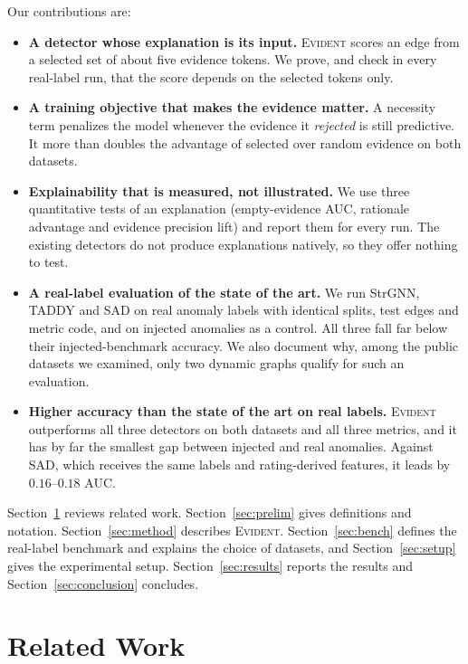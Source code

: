 \documentclass[pdflatex,sn-basic]{sn-jnl}
\newcommand{\evident}{\textsc{Evident}}
\theoremstyle{definition}
\theoremstyle{plain}
\begin{document}
Our contributions are:
\begin{itemize}
\item \textbf{A detector whose explanation is its input.} \evident{} scores an
edge from a selected set of about five evidence tokens. We prove, and check
in every real-label run, that the score depends on the selected tokens only.
\item \textbf{A training objective that makes the evidence matter.} A necessity
term penalizes the model whenever the evidence it \emph{rejected} is still
predictive. It more than doubles the advantage of selected over random
evidence on both datasets.
\item \textbf{Explainability that is measured, not illustrated.} We use three
quantitative tests of an explanation (empty-evidence AUC, rationale advantage
and evidence precision lift) and report them for every run. The existing
detectors do not produce explanations natively, so they offer nothing to test.
\item \textbf{A real-label evaluation of the state of the art.} We run StrGNN,
TADDY and SAD on real anomaly labels with identical splits, test edges and
metric code, and on injected anomalies as a control. All three fall far below
their injected-benchmark accuracy. We also document why, among the public
datasets we examined, only two dynamic graphs qualify for such an evaluation.
\item \textbf{Higher accuracy than the state of the art on real labels.}
\evident{} outperforms all three detectors on both datasets and all three
metrics, and it has by far the smallest gap between injected and real
anomalies. Against SAD, which receives the same labels and rating-derived
features, it leads by $0.16$--$0.18$ AUC.
\end{itemize}

Section~\ref{sec:related} reviews related work. Section~\ref{sec:prelim} gives
definitions and notation. Section~\ref{sec:method} describes \evident{}.
Section~\ref{sec:bench} defines the real-label benchmark and explains the
choice of datasets, and Section~\ref{sec:setup} gives the experimental
setup. Section~\ref{sec:results} reports the results and
Section~\ref{sec:conclusion} concludes.

\section{Related Work}
\label{sec:related}
\end{document}
